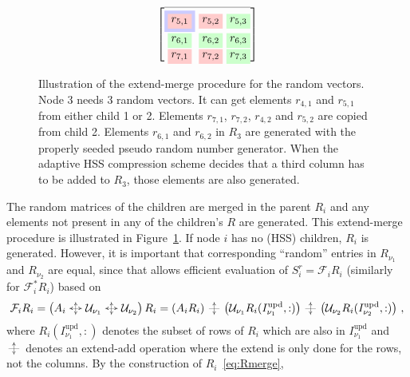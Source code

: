 \documentclass{article}
\newcommand{\extadd}{\mathbin{\hspace{0.65em}\text{\makebox[0pt]{\resizebox{0.3em}{0.85em}{\(\updownarrow\)}}\raisebox{0.15em}{\makebox[0pt]{\resizebox{1.3em}{0.2em}{\(\leftrightarrow\)}}}}\hspace{0.65em}}}
\newcommand{\skinnyextadd}{\mathbin{\hspace{0.65em}\text{\makebox[0pt]{\resizebox{0.3em}{0.85em}{\(\updownarrow\)}}\raisebox{0.15em}{\makebox[0pt]{\resizebox{1.3em}{0.2em}{$-$}}}}\hspace{0.65em}}}
\begin{document}
\begin{figure}
\begin{subfigure}{.64\textwidth}
\begin{center}
\begin{equation*}
{\begin{bmatrix}
            \cmidrule(lr){1-3}
            \colorbox{blue!20}{\colorbox{red!20}{$r_{5,1}$}} & \!\!\!\!\colorbox{red!20}{$r_{5,2}$} & \!\!\!\!\colorbox{green!20}{$r_{5,3}$} \\
            \colorbox{green!20}{$r_{6,1}$} & \!\!\!\!\colorbox{green!20}{$r_{6,2}$} & \!\!\!\!\colorbox{green!20}{$r_{6,3}$} \\
            \colorbox{red!20}{$r_{7,1}$} & \!\!\!\!\colorbox{red!20}{$r_{7,2}$} & \!\!\!\!\colorbox{green!20}{$r_{7,3}$} \\
\end{bmatrix}}
      \end{equation*}   
    \end{center}
  \end{subfigure}
  \caption{\footnotesize Illustration of the extend-merge procedure for the
    random vectors. Node 3 needs 3 random vectors. It can get elements
    $r_{4,1}$ and $r_{5,1}$ from either child 1 or 2. Elements
    $r_{7,1}$, $r_{7,2}$, $r_{4,2}$ and $r_{5,2}$ are copied from
    child 2. Elements $r_{6,1}$ and $r_{6,2}$ in $R_3$ are generated
    with the properly seeded pseudo random number generator. When the
    adaptive HSS compression scheme decides that a third column has to
    be added to $R_3$, those elements are also generated. }
  \label{fig:extend-add}
\end{figure}
The random matrices of the children are merged in the parent $R_i$ and
any elements not present in any of the children's $R$ are
generated. This extend-merge procedure is illustrated in
Figure~\ref{fig:extend-add}. If node $i$ has no (HSS) children, $R_i$
is generated. However, it is important that corresponding ``random''
entries in $R_{\nu_1}$ and $R_{\nu_2}$ are equal, since that allows
efficient evaluation of $S^r_i = \mathcal{F}_{i} R_i$ (similarly for
$\mathcal{F}^*_{i} R_i$) based on
\begin{equation}\label{eq:FtimesR}
  \mathcal{F}_{i} R_i = \left( A_{i} \extadd \mathcal{U}_{\nu_1} \extadd \mathcal{U}_{\nu_2} \right) R_i 
  = \left( A_{i} R_i \right) \skinnyextadd \left( \mathcal{U}_{\nu_1} R_i(I^{\mathrm{upd}}_{\nu_1},:) \right) 
  \skinnyextadd \left( \mathcal{U}_{\nu_2} R_i(I^{\mathrm{upd}}_{\nu_2},:) \right) \,,
\end{equation}
where $R_i(I^{\mathrm{upd}}_{\nu_1},:)$ denotes the subset of rows of
$R_i$ which are also in $I^{\mathrm{upd}}_{\nu_1}$ and $\skinnyextadd$
denotes an extend-add operation where the extend is only done for the
rows, not the columns. By the construction of $R_i$~\eqref{eq:Rmerge},
\end{document}
